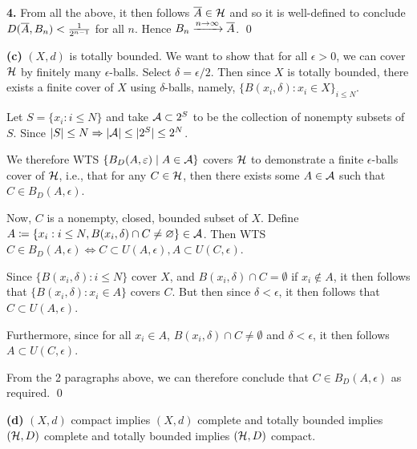 \documentclass[a4paper, 10pt]{article}
\begin{document}
\begin{solution}
    \textbf{4.} From all the above, it then follows $\overline{A} \in \mathcal{H}$ and so it is well-defined to conclude $D(\overline{A}, B_n) < \frac{1}{2^{n-1}}$ for all $n$. Hence $B_n \xrightarrow{n \to \infty} \overline{A}$. \qed

    \textbf{(c)} $(X, d)$ is totally bounded. We want to show that for all $\epsilon > 0$, we can cover $\mathcal{H}$ by finitely many $\epsilon$-balls. Select $\delta = \epsilon/2$. Then since $X$ is totally bounded, there exists a finite cover of $X$ using $\delta$-balls, namely, $\{B(x_i, \delta) : x_i \in X\}_{i \leq N}$.

    Let $S = \{x_i : i \leq N\}$ and take $\mathcal{A} \subset 2^S$ to be the collection of nonempty subsets of $S$. Since $\lvert S\rvert \leq N \Rightarrow \lvert\mathcal{A}\rvert \leq \lvert2^S\rvert \leq 2^N$.
    
    We therefore WTS $\{B_D(A, \varepsilon) \mid A \in \mathcal{A}\}$ covers $\mathcal{H}$ to demonstrate a finite $\epsilon$-balls cover of $\mathcal{H}$, i.e., that for any $C \in \mathcal{H}$, then there exists some $A \in \mathcal{A}$ such that $C \in B_D(A, \epsilon)$.

    Now, $C$ is a nonempty, closed, bounded subset of $X$. Define $A \coloneqq \{x_i : i \leq N, B(x_i, \delta) \cap C \neq \varnothing\} \in \mathcal{A}$. Then WTS $C \in B_D(A, \epsilon) \Leftrightarrow C \subset U(A, \epsilon), A \subset U(C, \epsilon)$.

    Since $\{B(x_i, \delta) : i \leq N\}$ cover $X$, and $B(x_i, \delta) \cap C = \emptyset$ if $x_i \not \in A$, it then follows that $\{B(x_i, \delta) : x_i \in A\}$ covers $C$. But then since $\delta < \epsilon$, it then follows that $C \subset U(A, \epsilon)$.
    
    Furthermore, since for all $x_i \in A$, $B(x_i, \delta) \cap C \neq \emptyset$ and $\delta < \epsilon$, it then follows $A \subset U(C, \epsilon)$.

    From the 2 paragraphs above, we can therefore conclude that $C \in B_D(A, \epsilon)$ as required. \qed

    \textbf{(d)} $(X, d)$ compact implies $(X, d)$ complete and totally bounded implies $(\mathcal{H}, D)$ complete and totally bounded implies $(\mathcal{H}, D)$ compact.

\end{solution}
\end{document}
